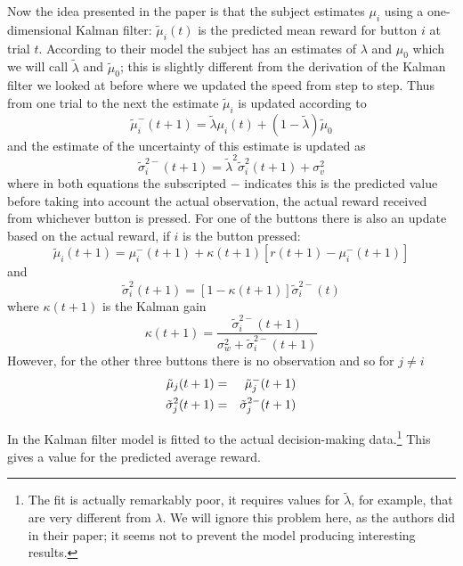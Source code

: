 \documentclass[12pt]{article}
\begin{document}
Now the idea presented in the paper is that the subject estimates
$\mu_i$ using a one-dimensional Kalman filter: $\tilde{\mu}_i(t)$ is
the predicted mean reward for button $i$ at trial $t$. According to
their model the subject has an estimates of $\lambda$ and $\mu_0$
which we will call $\tilde{\lambda}$ and $\tilde{\mu}_0$; this is
slightly different from the derivation of the Kalman filter we looked
at before where we updated the speed from step to step. Thus from one
trial to the next the estimate $\tilde{\mu}_i$ is updated according to
\begin{equation}
\tilde{\mu}_i^-(t+1)=\tilde{\lambda}\mu_i(t)+(1-\tilde{\lambda})\tilde{\mu}_0
\end{equation}
and the estimate of the uncertainty of this estimate is updated as
\begin{equation}
\tilde{\sigma}^{2-}_i(t+1)=\tilde{\lambda}^2\tilde{\sigma}^2_i(t+1)+\sigma^2_v
\end{equation}
where in both equations the subscripted $-$ indicates this is the
predicted value before taking into account the actual observation, the
actual reward received from whichever button is pressed. For one of
the buttons there is also an update based on the actual reward, if $i$
is the button pressed:
\begin{equation}
\tilde{\mu}_i(t+1)=\mu_i^-(t+1)+\kappa(t+1)[r(t+1)-\mu_i^-(t+1)]
\end{equation}
and
\begin{equation}
\tilde{\sigma}^{2}_i(t+1)=[1-\kappa(t+1)]\tilde{\sigma}^{2-}_i(t)
\end{equation}
where $\kappa(t+1)$ is the Kalman gain
\begin{equation}
\kappa(t+1)=\frac{\tilde{\sigma}^{2-}_i(t+1)}{\sigma^2_w+\tilde{\sigma}^{2-}_i(t+1)}
\end{equation}
However, for the other three buttons there is no observation and so for $j\not = i$
\begin{eqnarray}
\tilde{\mu}_j(t+1)&=&\tilde{\mu}^-_j(t+1)\cr
\tilde{\sigma}^{2}_j(t+1)&=&\tilde{\sigma}^{2-}_j(t+1)
\end{eqnarray}

In \citet{DawEtAl2006} the Kalman filter model is fitted to the actual
decision-making data.\footnote{The fit is actually remarkably poor, it
  requires values for $\tilde{\lambda}$, for example, that are very
  different from $\lambda$. We will ignore this problem here, as the
  authors did in their paper; it seems not to prevent the model
  producing interesting results.} This gives a value for the predicted
average reward.
\end{document}
